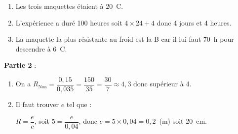 \documentclass[10pt]{article}
\begin{document}

\begin{enumerate}
\item  %
Les trois maquettes étaient à 20~\degres C. 

\item %
L'expérience a duré 100 heures soit $4 \times 24 + 4$ donc 4 jours et 4 heures.

\item %
La maquette la plus résistante au froid est la B car il lui faut  70~h pour descendre à 6~\degres C.
\end{enumerate}

\medskip

\textbf{Partie 2 }: 

%
%

\medskip

\begin{enumerate}
\item  %

On a $R_{\text{Noa}} = \dfrac{0,15}{0,035} = \dfrac{150}{35} = \dfrac{30}{7} \approx 4,3$ donc supérieur à 4.
\item  %

Il faut trouver $e$ tel que :

$R = \dfrac{e}{c}$, soit $5 = \dfrac{e}{0,04}$, donc $e = 5 \times 0,04 = 0,2$~(m) soit 20~cm.
\end{enumerate}

\bigskip
\end{document}
